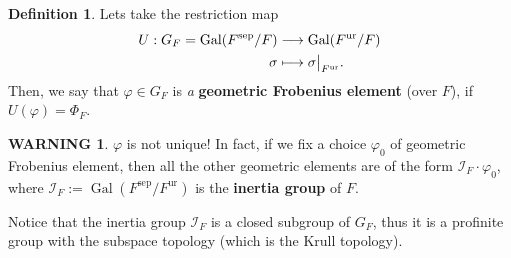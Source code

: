 \documentclass[12pt]{article}
\theoremstyle{plain}
\theoremstyle{definition}
\newtheorem{definition}[theorem]{Definition}
\newtheorem{warn}[theorem]{\textbf{WARNING}}
\renewenvironment{warning}{\begin{warn}}{\end{warn}}
\newcommand\rest[2]{{%
  \left.\kern-\nulldelimiterspace %
  #1 %
  \vphantom{\big|} %
  \right|_{#2} %
  }}
\newcommand{\Gal}[2]{\operatorname{Gal} ( #1 / #2 )}
\newcommand{\sep}[1]{{#1}^{\operatorname{sep}}}
\newcommand{\ur}[1]{{#1}^{\operatorname{ur}}}
\newcommand{\inercia}[1]{\mathcal I_{#1}}
\begin{document}
\begin{definition}
Lets take the restriction map
\begin{align*}
  U : G_F = \Gal {\sep F} F &\longrightarrow \Gal {\ur F} F \\
 \sigma &\longmapsto \rest{\sigma}{\ur F}.
\end{align*}
Then, we say that $\varphi \in G_F$ is \textit{a} \textbf{geometric Frobenius element} (over $F$), if $U(\varphi) = \Phi_F$.
\end{definition}

\begin{warning}
$\varphi$ is not unique! In fact, if we fix a choice $\varphi_0$ of geometric Frobenius element, then all the other geometric elements are of the form $\inercia F \cdot \varphi_0$, where $\inercia F := \Gal {\sep F} {\ur F}$ is the \textbf{inertia group} of $F$.
\end{warning}

Notice that the inertia group $\inercia F$ is a closed subgroup of $G_F$, thus it is a profinite group with the subspace topology (which is the Krull topology).
\end{document}
